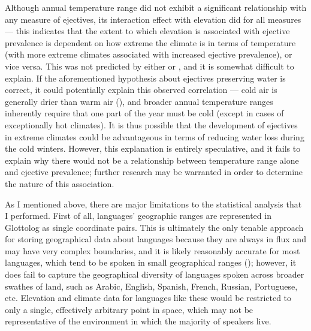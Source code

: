 \documentclass{article}
\begin{document}
Although annual temperature range did not exhibit a significant relationship with any measure of ejectives, its interaction effect with elevation did for all measures --- this indicates that the extent to which elevation is associated with ejective prevalence is dependent on how extreme the climate is in terms of temperature (with more extreme climates associated with increased ejective prevalence), or vice versa. This was not predicted by either \textcite{everett2013} or \textcite{urban2021}, and it is somewhat difficult to explain. If the aforementioned hypothesis about ejectives preserving water is correct, it could potentially explain this observed correlation --- cold air is generally drier than warm air (\cite{koskela2007}), and broader annual temperature ranges inherently require that one part of the year must be cold (except in cases of exceptionally hot climates). It is thus possible that the development of ejectives in extreme climates could be advantageous in terms of reducing water loss during the cold winters. However, this explanation is entirely speculative, and it fails to explain why there would not be a relationship between temperature range alone and ejective prevalence; further research may be warranted in order to determine the nature of this association.

As I mentioned above, there are major limitations to the statistical analysis that I performed. First of all, languages' geographic ranges are represented in Glottolog as single coordinate pairs. This is ultimately the only tenable approach for storing geographical data about languages because they are always in flux and may have very complex boundaries, and it is likely reasonably accurate for most languages, which tend to be spoken in small geographical ranges (\cite{hua2019}); however, it does fail to capture the geographical diversity of languages spoken across broader swathes of land, such as Arabic, English, Spanish, French, Russian, Portuguese, etc. Elevation and climate data for languages like these would be restricted to only a single, effectively arbitrary point in space, which may not be representative of the environment in which the majority of speakers live. 
\end{document}
